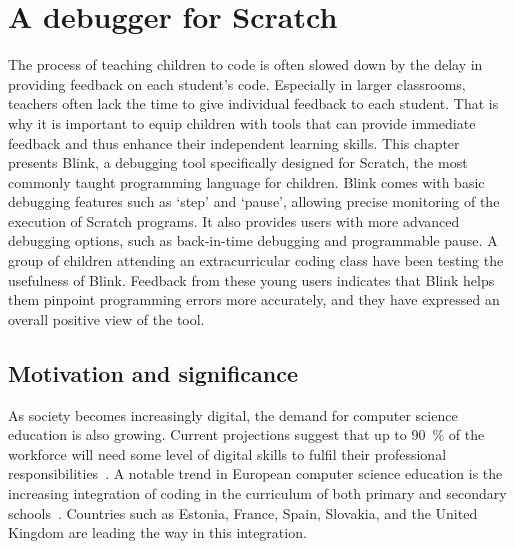 \documentclass[../main]{subfiles}
\begin{document}
\chapter{A debugger for Scratch}\label{ch:blink}


The process of teaching children to code is often slowed down by the delay in providing feedback on each student's code.
Especially in larger classrooms, teachers often lack the time to give individual feedback to each student.
That is why it is important to equip children with tools that can provide immediate feedback and thus enhance their independent learning skills.
This chapter presents Blink, a debugging tool specifically designed for Scratch, the most commonly taught programming language for children.
Blink comes with basic debugging features such as `step' and `pause', allowing precise monitoring of the execution of Scratch programs.
It also provides users with more advanced debugging options, such as back-in-time debugging and programmable pause.
A group of children attending an extracurricular coding class have been testing the usefulness of Blink.
Feedback from these young users indicates that Blink helps them pinpoint programming errors more accurately, and they have expressed an overall positive view of the tool.

\section{Motivation and significance}\label{sec:blink-motivation}

As society becomes increasingly digital, the demand for computer science education is also growing.
Current projections suggest that up to \qty{90}{\percent} of the workforce will need some level of digital skills to fulfil their professional responsibilities~\autocite{bejakovicImportanceDigitalLiteracy2020a}.
A notable trend in European computer science education is the increasing integration of coding in the curriculum of both primary and secondary schools~\autocite{balanskatComputingOurFuture2015a}.
Countries such as Estonia, France, Spain, Slovakia, and the United Kingdom are leading the way in this integration.
\end{document}
